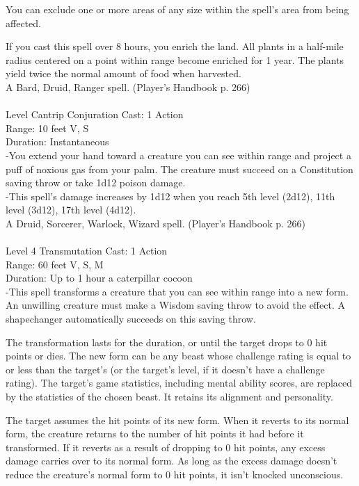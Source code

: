 \documentclass[10pt,twocolumn]{report}
\begin{document}
You can exclude one or more areas of any size within the spell’s area from being affected.

If you cast this spell over 8 hours, you enrich the land. All plants in a half-mile radius centered on a point within range become enriched for 1 year. The plants yield twice the normal amount of food when harvested.\\
A Bard, Druid, Ranger spell. (Player's Handbook p. 266) \\


 \\
Level Cantrip \quad Conjuration \quad Cast: 1 Action\\
Range: 10 feet \quad V, S\\
Duration: Instantaneous \quad \\
-You extend your hand toward a creature you can see within range and project a puff of noxious gas from your palm. The creature must succeed on a Constitution saving throw or take 1d12 poison damage.\\
-This spell’s damage increases by 1d12 when you reach 5th level (2d12), 11th level (3d12), 17th level (4d12).\\
A Druid, Sorcerer, Warlock, Wizard spell. (Player's Handbook p. 266) \\


 \\
Level 4 \quad Transmutation \quad Cast: 1 Action\\
Range: 60 feet \quad V, S, M\\
Duration: Up to 1 hour \quad a caterpillar cocoon\\
-This spell transforms a creature that you can see within range into a new form. An unwilling creature must make a Wisdom saving throw to avoid the effect. A shapechanger automatically succeeds on this saving throw.

The transformation lasts for the duration, or until the target drops to 0 hit points or dies. The new form can be any beast whose challenge rating is equal to or less than the target’s (or the target’s level, if it doesn’t have a challenge rating). The target’s game statistics, including mental ability scores, are replaced by the statistics of the chosen beast. It retains its alignment and personality.

The target assumes the hit points of its new form. When it reverts to its normal form, the creature returns to the number of hit points it had before it transformed. If it reverts as a result of dropping to 0 hit points, any excess damage carries over to its normal form. As long as the excess damage doesn’t reduce the creature’s normal form to 0 hit points, it isn’t knocked unconscious.
\end{document}
